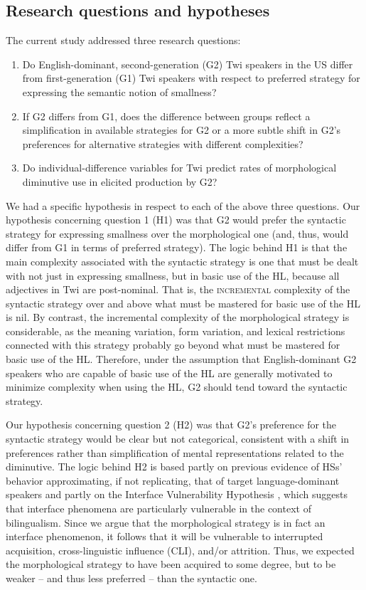 \documentclass[output=paper,colorlinks,citecolor=brown]{langscibook}
\begin{document}
\subsection{Research questions and hypotheses}
\label{QuestionsHypothesisSec}

The current study addressed three research questions:
\begin{enumerate}
\item Do English-dominant, second-generation (G2) Twi speakers in the US differ from first-generation (G1) Twi speakers with respect to preferred strategy for expressing the semantic notion of smallness?
\item If G2 differs from G1, does the difference between groups reflect a simplification in available strategies for G2 or a more subtle shift in G2's preferences for alternative strategies with different complexities?
\item Do individual-difference variables for Twi predict rates of morphological diminutive use in elicited production by G2?
\end{enumerate}

We had a specific hypothesis in respect to each of the above three questions. Our hypothesis concerning question 1 (H1) was that G2 would prefer the syntactic strategy for expressing smallness over the morphological one (and, thus, would differ from G1 in terms of preferred strategy). The logic behind H1 is that the main complexity associated with the syntactic strategy is one that must be dealt with not just in expressing smallness, but in basic use of the HL, because all adjectives in Twi are post-nominal. That is, the \textsc{incremental} complexity of the syntactic strategy over and above what must be mastered for basic use of the HL is nil. By contrast, the incremental complexity of the morphological strategy is considerable, as the meaning variation, form variation, and lexical restrictions connected with this strategy probably go beyond what must be mastered for basic use of the HL. Therefore, under the assumption that English-dominant G2 speakers who are capable of basic use of the HL are generally motivated to minimize complexity when using the HL, G2 should tend toward the syntactic strategy.

Our hypothesis concerning question 2 (H2) was that G2's preference for the syntactic strategy would be clear but not categorical, consistent with a shift in preferences rather than simplification of mental representations related to the diminutive. The logic behind H2 is based partly on previous evidence of HSs' behavior approximating, if not replicating, that of target language-dominant speakers \citep[e.g.,][]{Montrul2010Dominant} and partly on the Interface Vulnerability Hypothesis \citep{SoraceFiliaci2006, Sorace2011}, which suggests that interface phenomena are particularly vulnerable in the context of bilingualism. Since we argue that the morphological strategy is in fact an interface phenomenon, it follows that it will be vulnerable to interrupted acquisition, cross-linguistic influence (CLI), and/or attrition. Thus, we expected the morphological strategy to have been acquired to some degree, but to be weaker -- and thus less preferred -- than the syntactic one.
\end{document}
